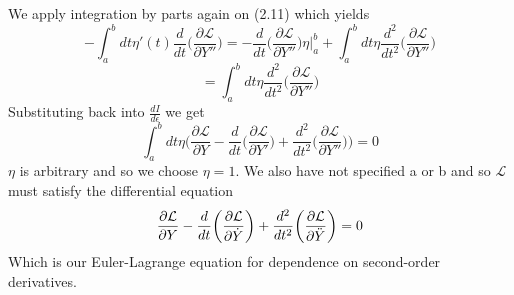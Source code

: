 \documentclass[11pt]{report}
\numberwithin{equation}{chapter}
\begin{document}
We apply integration by parts again on (2.11) which yields
\begin{equation}
    -\int_a^b dt \eta'(t) \frac{d}{dt}\bigg(\frac{\partial\mathcal{L}}{\partial Y''}\bigg)=-\frac{d}{dt}\bigg(\frac{\partial\mathcal{L}}{\partial Y''}\bigg)\eta\bigg|_a^b+\int_a^b dt\eta\frac{d^2}{dt^2}\bigg(\frac{\partial\mathcal{L}}{\partial Y''}\bigg)
\end{equation}
\begin{equation}
    =\int_a^b dt\eta\frac{d^2}{dt^2}\bigg(\frac{\partial\mathcal{L}}{\partial Y''}\bigg)
\end{equation}
Substituting back into $\frac{dI}{d\epsilon}$ we get
\begin{equation}
    \int_a^bdt\eta\bigg(\frac{\partial\mathcal{L}}{\partial Y}-\frac{d}{dt}\bigg(\frac{\partial\mathcal{L}}{\partial Y'}\bigg)+\frac{d^2}{dt^2}\bigg(\frac{\partial\mathcal{L}}{\partial Y''}\bigg)\bigg)=0
\end{equation}
$\eta$ is arbitrary and so we choose $\eta=1$. We also have not specified a or b and so $\mathcal{L}$ must satisfy the differential equation
\begin{equation}
    \frac{\partial\mathcal{L}}{\partial Y}-\frac{d}{dt}\bigg(\frac{\partial\mathcal{L}}{\partial \Dot{Y}}\bigg)+\frac{d^2}{dt^2}\bigg(\frac{\partial\mathcal{L}}{\partial \Ddot{Y}}\bigg)=0
\end{equation}
Which is our Euler-Lagrange equation for dependence on second-order derivatives.
\end{document}
